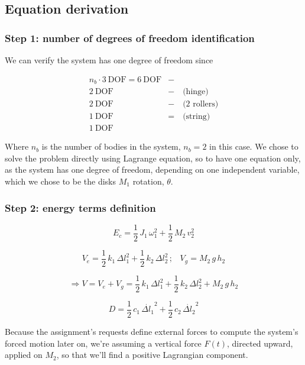 \documentclass[a4paper,12pt,oneside]{article}
\begin{document}
\subsection{Equation derivation}

\subsubsection*{Step 1: number of degrees of freedom identification}

We can verify the system has one degree of freedom since

\[ \begin{split}
	n_b \cdot 3 ~ \text{DOF} = 6 ~ \text{DOF} & - \\
	2 ~ \text{DOF} & - \quad \text{(hinge)} \\
	2 ~ \text{DOF}  & - \quad \text{(2 rollers)} \\
	1 ~ \text{DOF} & = \quad \text{(string)} \\
	1 ~ \text{DOF}
\end{split} \]

Where $ n_b $ is the number of bodies in the system, $ n_b = 2 $ in this case. We chose to solve the problem directly using Lagrange equation, so to have one equation only, as the system has one degree of freedom, depending on one independent variable, which we chose to be the disks $ M_1 $ rotation, $ \theta $.

\subsubsection*{Step 2: energy terms definition}
\label{subs:energy_terms}

\[ E_c = \frac{1}{2} \, J_1 \, \omega_1^2 + \frac{1}{2} \, M_2 \, v_2^2 \]

\[
	V_e = \frac{1}{2} \, k_1 \, \Delta l_1^2 + %
		\frac{1}{2} \, k_2 \, \Delta l_2^2 \, \text{;} \quad V_g = M_2 \, g \, h_2
\]

\[
	\Rightarrow V = V_e + V_g = %
		\frac{1}{2} \, k_1 \, \Delta l_1^2 + \frac{1}{2} \, k_2 \, \Delta l_2^2 %
		+ M_2 \, g \, h_2
\]

\[
	D = \frac{1}{2} \, c_1 \, \dot{\Delta l_1}^2 + %
		\frac{1}{2} \, c_2 \, \dot{\Delta l_2}^2
\]

Because the assignment's requests define external forces to compute the system's forced motion later on, we're assuming a vertical force $ F(t) $, directed upward, applied on $ M_2 $, so that we'll find a positive Lagrangian component.
\end{document}

